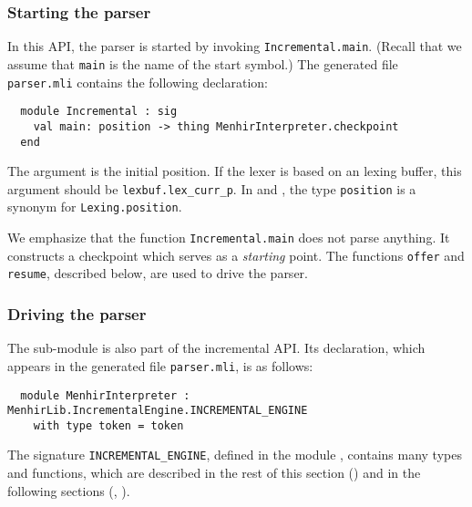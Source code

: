 \documentclass[onecolumn,11pt,nocopyrightspace,preprint]{sigplanconf}
\begin{document}



\subsubsection{Starting the parser}

In this API, the parser is started by invoking
\verb+Incremental.main+. (Recall that we assume that \verb+main+ is
the name of the start symbol.) The generated file \texttt{parser.mli} contains
the following declaration:
\begin{verbatim}
  module Incremental : sig
    val main: position -> thing MenhirInterpreter.checkpoint
  end
\end{verbatim}
The argument is the initial position. If the lexer is based on an \ocaml
lexing buffer, this argument should be \verb+lexbuf.lex_curr_p+.
In  and ,
the type \verb+position+ is a synonym for \verb+Lexing.position+.

We emphasize that the function \verb+Incremental.main+ does not parse
anything. It constructs a checkpoint which serves as a \emph{starting}
point. The functions \verb+offer+ and \verb+resume+, described below, are used
to drive the parser.


\subsubsection{Driving the parser}
\label{sec:incremental:driving}

The sub-module \menhirinterpreter is also part of the incremental API.
Its declaration, which appears in the generated file \texttt{parser.mli}, is as
follows:
\begin{verbatim}
  module MenhirInterpreter : MenhirLib.IncrementalEngine.INCREMENTAL_ENGINE
    with type token = token
\end{verbatim}
The signature \verb+INCREMENTAL_ENGINE+, defined in the module
\menhirlibincrementalengine, contains many types and functions,
which are described in the rest of this section
() and in the following sections
(, ).
\end{document}
